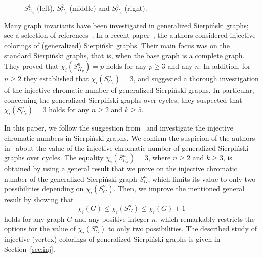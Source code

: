 \documentclass{article}
\begin{document}
\begin{figure}[ht!]
\begin{center}
\caption{$S_{C_4}^1$ (left), $S_{C_4}^2$ (middle) and  $S_{C_4}^3$ (right).}
\label{fig:S_C_4}
\end{center}
\end{figure}

Many graph invariants have been investigated in generalized Sierpi\'{n}ski graphs; see a selection of references~\cite{bf, er, erv, gs, kz, korze-2019, pjk, rre}. In a recent paper~\cite{bksy}, the authors considered injective colorings of (generalized) Sierpi\'{n}ski graphs. Their main focus was on the standard Sierpi\' nski graphs, that is, when the base graph is a complete graph.  They proved that $\chi_i(S_{K_p}^n)=p$ holds for any $p\ge 3$ and any $n$. In addition, for $n\ge 2$ they established that $\chi_i(S_{C_4}^n) = 3$, and suggested a thorough investigation of the injective chromatic number of generalized Sierpi\'nski graphs. In particular, concerning the generalized Sierpi\'{n}ski graphs over cycles, they suspected that $\chi_i(S_{C_k}^n) = 3$ holds for any $n\ge 2$ and $k\ge 5$.  

In this paper, we follow the suggestion from~\cite{bksy} and investigate the injective chromatic numbers in  Sierpi\'{n}ski graphs. We confirm the suspicion of the authors in~\cite{bksy} about the value of the injective chromatic number of generalized Sierpi\'{n}ski graphs over cycles. The equality $\chi_i(S_{C_k}^n) = 3$, where $n\ge 2$ and $k\ge 3$, is obtained by using a general result that we prove on the injective chromatic number of the generalized Sierpi\'{n}ski graph $S_G^n$, which limits its value to only two possibilities  depending on $\chi_i(S_G^2)$. Then, we improve the mentioned general result by showing that $$\chi_i(G)\le\chi_i(S_G^n)\le \chi_i(G)+1$$
holds for any graph $G$ and any positive integer $n$, which remarkably restricts the options for the value of $\chi_i(S_G^n)$ to only two possibilities. The described study of injective (vertex) colorings of generalized Sierpi\'{n}ski graphs is given in Section~\ref{sec:inj}.
\end{document}
